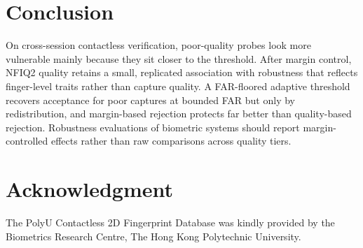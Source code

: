 \documentclass[10pt,twocolumn,letterpaper]{article}
\begin{document}
\section{Conclusion}
On cross-session contactless verification, poor-quality probes look more vulnerable mainly because they sit closer to the threshold. After margin control, NFIQ2 quality retains a small, replicated association with robustness that reflects finger-level traits rather than capture quality. A FAR-floored adaptive threshold recovers acceptance for poor captures at bounded FAR but only by redistribution, and margin-based rejection protects far better than quality-based rejection. Robustness evaluations of biometric systems should report margin-controlled effects rather than raw comparisons across quality tiers.

\section*{Acknowledgment}
The PolyU Contactless 2D Fingerprint Database was kindly provided by the Biometrics Research Centre, The Hong Kong Polytechnic University.

{\small


}
\end{document}
